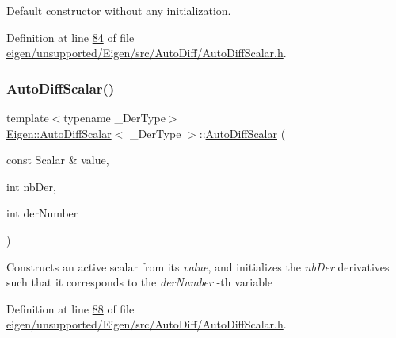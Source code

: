 Default constructor without any initialization. 

Definition at line \hyperlink{eigen_2unsupported_2_eigen_2src_2_auto_diff_2_auto_diff_scalar_8h_source_l00084}{84} of file \hyperlink{eigen_2unsupported_2_eigen_2src_2_auto_diff_2_auto_diff_scalar_8h_source}{eigen/unsupported/\+Eigen/src/\+Auto\+Diff/\+Auto\+Diff\+Scalar.\+h}.

\mbox{\label{class_eigen_1_1_auto_diff_scalar_a7f4f44f682ba5d500c34c4f2fa6ecb9e}} 
\subsubsection{\texorpdfstring{Auto\+Diff\+Scalar()}{AutoDiffScalar()}\hspace{0.1cm}{\footnotesize\ttfamily [2/8]}}
{\footnotesize\ttfamily template$<$typename \+\_\+\+Der\+Type$>$ \\
\hyperlink{class_eigen_1_1_auto_diff_scalar}{Eigen\+::\+Auto\+Diff\+Scalar}$<$ \+\_\+\+Der\+Type $>$\+::\hyperlink{class_eigen_1_1_auto_diff_scalar}{Auto\+Diff\+Scalar} (\begin{DoxyParamCaption}\item[{const Scalar \&}]{value,  }\item[{int}]{nb\+Der,  }\item[{int}]{der\+Number }\end{DoxyParamCaption})\hspace{0.3cm}{\ttfamily [inline]}}

Constructs an active scalar from its {\itshape value}, and initializes the {\itshape nb\+Der} derivatives such that it corresponds to the {\itshape der\+Number} -\/th variable 

Definition at line \hyperlink{eigen_2unsupported_2_eigen_2src_2_auto_diff_2_auto_diff_scalar_8h_source_l00088}{88} of file \hyperlink{eigen_2unsupported_2_eigen_2src_2_auto_diff_2_auto_diff_scalar_8h_source}{eigen/unsupported/\+Eigen/src/\+Auto\+Diff/\+Auto\+Diff\+Scalar.\+h}.

\mbox{\label{class_eigen_1_1_auto_diff_scalar_a14e0f5ecc595deb05aaf336f5a81b861}} 
